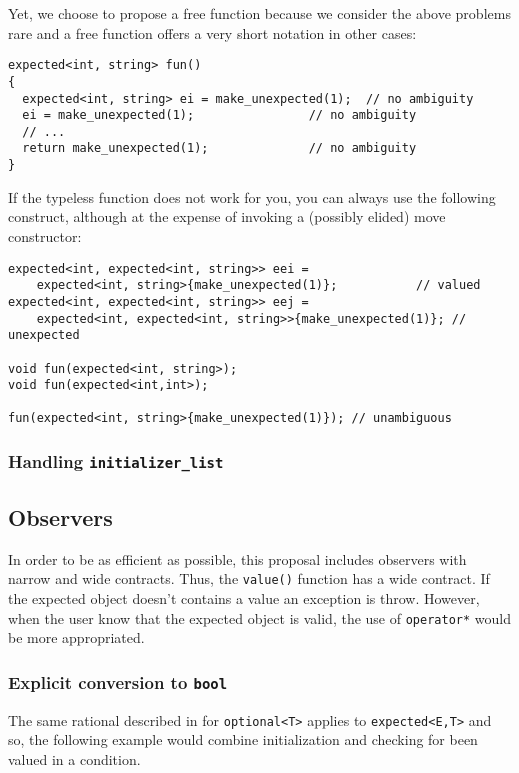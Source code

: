 \documentclass[a4paper,10pt]{article}
\newcommand{\cpp}[1]{\lstinline{#1}}
\begin{document}
Yet, we choose to propose a free function because we consider the above problems rare and a free function offers a very short notation in other cases:

\begin{lstlisting}
expected<int, string> fun()
{
  expected<int, string> ei = make_unexpected(1);  // no ambiguity
  ei = make_unexpected(1);                // no ambiguity
  // ...
  return make_unexpected(1);              // no ambiguity
}
\end{lstlisting}

If the typeless function does not work for you, you can always use the following construct, although at the expense of invoking a (possibly elided) move constructor:

\begin{lstlisting}
expected<int, expected<int, string>> eei = 
    expected<int, string>{make_unexpected(1)};           // valued
expected<int, expected<int, string>> eej = 
    expected<int, expected<int, string>>{make_unexpected(1)}; // unexpected

void fun(expected<int, string>);
void fun(expected<int,int>);

fun(expected<int, string>{make_unexpected(1)}); // unambiguous 
\end{lstlisting}

\subsubsection{Handling \cpp{initializer_list}}

\subsection{Observers}

In order to be as efficient as possible, this proposal includes observers with narrow and wide contracts. Thus, the \cpp{value()} function has a wide contract. If the expected object doesn't contains a value an exception is throw. However, when the user know that the expected object is valid, the use of \cpp{operator*} would be more appropriated. 

\subsubsection{Explicit conversion to \cpp{bool}}

The same rational described in \cite{OptionalRev4} for \cpp{optional<T>} applies to \cpp{expected<E,T>} and so, the following example would combine initialization and  checking for been valued in a condition.
\end{document}
